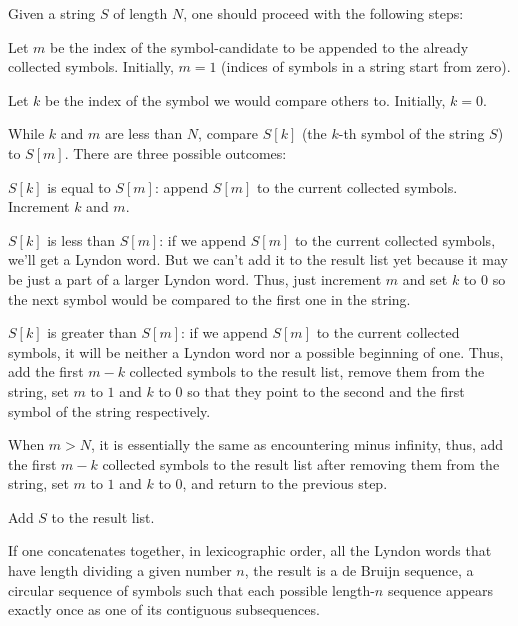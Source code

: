 Given a string $S$ of length $N$, one should proceed with the following steps:

\begin{compactenum}
\item Let $m$ be the index of the symbol-candidate to be appended to the already collected symbols. Initially, $m = 1$ (indices of symbols in a string start from zero).
\item Let $k$ be the index of the symbol we would compare others to. Initially, $k = 0$.
\item While $k$ and $m$ are less than $N$, compare $S[k]$ (the $k$-th symbol of the string $S$) to $S[m]$. There are three possible outcomes:
\begin{compactenum}
\item $S[k]$ is equal to $S[m]$: append $S[m]$ to the current collected symbols. Increment $k$ and $m$.
\item $S[k]$ is less than $S[m]$: if we append $S[m]$ to the current collected symbols, we'll get a Lyndon word. But we can't add it to the result list yet because it may be just a part of a larger Lyndon word. Thus, just increment $m$ and set $k$ to $0$ so the next symbol would be compared to the first one in the string.
\item $S[k]$ is greater than $S[m]$: if we append $S[m]$ to the current collected symbols, it will be neither a Lyndon word nor a possible beginning of one. Thus, add the first $m-k$ collected symbols to the result list, remove them from the string, set $m$ to $1$ and $k$ to $0$ so that they point to the second and the first symbol of the string respectively.
\end{compactenum}
\item When $m > N$, it is essentially the same as encountering minus infinity, thus, add the first $m-k$ collected symbols to the result list after removing them from the string, set $m$ to $1$ and $k$ to $0$, and return to the previous step.
\item Add $S$ to the result list.
\end{compactenum}

If one concatenates together, in lexicographic order, all the Lyndon words that have length dividing a given number $n$, the result is a de Bruijn sequence, a circular sequence of symbols such that each possible length-$n$ sequence appears exactly once as one of its contiguous subsequences.

\inputminted{cpp}{src/string/decomposition/lyndon-word.cpp.com}
